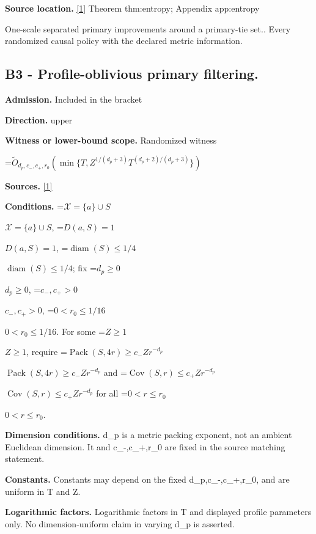 \documentclass[10pt,a4paper]{article}
\newcommand{\AtlasMath}[1]{\par\begingroup\centering\setbox0=\hbox{$\displaystyle #1$}\ifdim\wd0>1.4\linewidth\typeout{ATLAS WIDE FORMULA: \the\wd0}\fi\ifdim\wd0>\linewidth\resizebox{\linewidth}{!}{\box0}\else\box0\fi\par\endgroup}
\newcommand{\AtlasInlineMath}[1]{\begingroup\setbox0=\hbox{$#1$}\ifdim\wd0>.4\linewidth\endgroup\AtlasMath{#1}\else\endgroup$#1$\fi}
\begin{document}
\textbf{Source location.} \href{https://github.com/WU-Wendao/Colombo/blob/main/colombo_sensorium/Complexity_altas/data/sources/colombo/U07/manuscript.pdf}{[1]} Theorem thm:entropy; Appendix app:entropy



One-scale separated primary improvements around a primary-tie set.. Every randomized causal policy with the declared metric information.



\subsection{B3 - Profile-oblivious primary filtering.}


\textbf{Admission.} Included in the bracket



\textbf{Direction.} upper



\textbf{Witness or lower-bound scope.} Randomized witness



\AtlasMath{\widetilde O_{d_p,c_-,c_+,r_0}(\min\{T,Z^{1/(d_p+3)}T^{(d_p+2)/(d_p+3)}\})}


\textbf{Sources.} \href{https://github.com/WU-Wendao/Colombo/blob/main/colombo_sensorium/Complexity_altas/data/sources/colombo/U07/manuscript.pdf}{[1]}



\textbf{Conditions.} \AtlasInlineMath{\mathcal X=\{a\}\cup S}, \AtlasInlineMath{D(a,S)=1}, \AtlasInlineMath{\operatorname{diam}(S)\le1/4}; fix \AtlasInlineMath{d_p\ge0}, \AtlasInlineMath{c_-,c_+>0}, \AtlasInlineMath{0<r_0\le1/16}. For some \AtlasInlineMath{Z\ge1}, require \AtlasInlineMath{\operatorname{Pack}(S,4r)\ge c_-Zr^{-d_p}} and \AtlasInlineMath{\operatorname{Cov}(S,r)\le c_+Zr^{-d_p}} for all \AtlasInlineMath{0<r\le r_0}.



\textbf{Dimension conditions.} d\_p is a metric packing exponent, not an ambient Euclidean dimension. It and c\_-,c\_+,r\_0 are fixed in the source matching statement.



\textbf{Constants.} Constants may depend on the fixed d\_p,c\_-,c\_+,r\_0, and are uniform in T and Z.



\textbf{Logarithmic factors.} Logarithmic factors in T and displayed profile parameters only. No dimension-uniform claim in varying d\_p is asserted.
\end{document}

